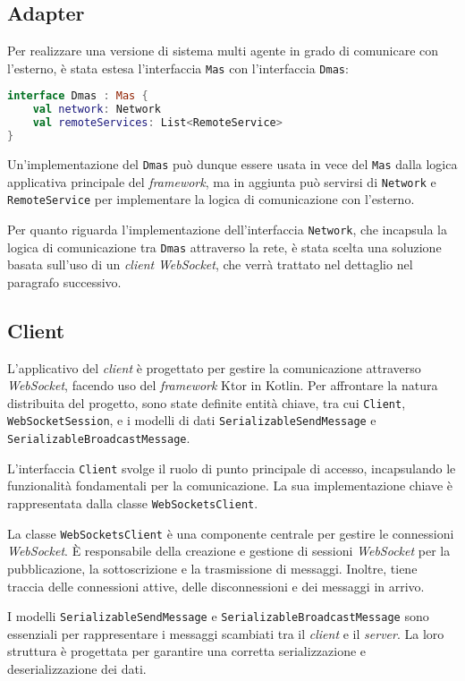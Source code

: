 \subsection{Adapter}
Per realizzare una versione di sistema multi agente in grado di comunicare con l'esterno, è stata estesa l'interfaccia \texttt{Mas} con l'interfaccia \texttt{Dmas}:

\begin{lstlisting}[language=Kotlin]
interface Dmas : Mas {
    val network: Network
    val remoteServices: List<RemoteService>
}
\end{lstlisting}

Un'implementazione del \texttt{Dmas} può dunque essere usata in vece del \texttt{Mas} dalla logica applicativa principale del \textit{framework}, ma in aggiunta può servirsi di \texttt{Network} e \texttt{RemoteService} per
implementare la logica di comunicazione con l'esterno.

Per quanto riguarda l'implementazione dell'interfaccia \texttt{Network}, che incapsula la logica di comunicazione tra \texttt{Dmas} attraverso la rete, è stata scelta una soluzione basata sull'uso
di un \textit{client} \textit{WebSocket}, che verrà trattato nel dettaglio nel paragrafo successivo.

\subsection{Client}
L'applicativo del \textit{client} è progettato per gestire la comunicazione attraverso \textit{WebSocket},
facendo uso del \textit{framework} Ktor in Kotlin. Per affrontare la natura distribuita del progetto,
sono state definite entità chiave, tra cui \texttt{Client}, \texttt{WebSocketSession}, e i modelli di dati
\texttt{SerializableSendMessage} e \texttt{SerializableBroadcastMessage}.

L'interfaccia \texttt{Client} svolge il ruolo di punto principale di accesso, incapsulando le funzionalità fondamentali per la
comunicazione. La sua implementazione chiave è rappresentata dalla classe \texttt{WebSocketsClient}.

La classe \texttt{WebSocketsClient} è una componente centrale per gestire le connessioni \textit{WebSocket}.
È responsabile della creazione e gestione di sessioni \textit{WebSocket} per la pubblicazione,
la sottoscrizione e la trasmissione di messaggi. Inoltre, tiene traccia delle connessioni attive, delle disconnessioni e dei messaggi in arrivo.

I modelli \texttt{SerializableSendMessage} e \texttt{SerializableBroadcastMessage} sono essenziali per rappresentare i messaggi scambiati tra il \textit{client} e
il  \textit{server}. La loro struttura è progettata per garantire una corretta serializzazione e deserializzazione dei dati.

